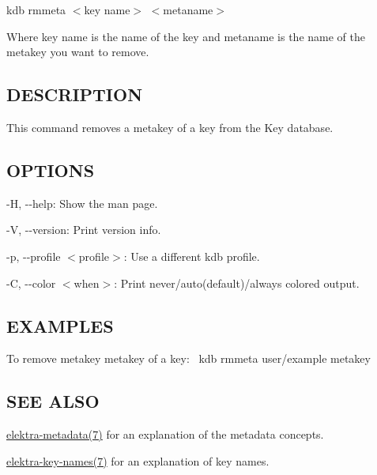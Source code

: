 {\ttfamily kdb rmmeta $<$key name$>$ $<$metaname$>$}

Where {\ttfamily key name} is the name of the key and {\ttfamily metaname} is the name of the metakey you want to remove.

\subsection*{D\+E\+S\+C\+R\+I\+P\+T\+I\+ON}

This command removes a metakey of a key from the Key database.

\subsection*{O\+P\+T\+I\+O\+NS}


\begin{DoxyItemize}
\item {\ttfamily -\/H}, {\ttfamily -\/-\/help}\+: Show the man page.
\item {\ttfamily -\/V}, {\ttfamily -\/-\/version}\+: Print version info.
\item {\ttfamily -\/p}, {\ttfamily -\/-\/profile $<$profile$>$}\+: Use a different kdb profile.
\item {\ttfamily -\/C}, {\ttfamily -\/-\/color $<$when$>$}\+: Print never/auto(default)/always colored output.
\end{DoxyItemize}

\subsection*{E\+X\+A\+M\+P\+L\+ES}

To remove metakey {\ttfamily metakey} of a key\+:~\newline
 {\ttfamily kdb rmmeta user/example metakey}

\subsection*{S\+EE A\+L\+SO}


\begin{DoxyItemize}
\item \hyperlink{md_doc_help_elektra-metadata_doc_help_elektra-metadata_md}{elektra-\/metadata(7)} for an explanation of the metadata concepts.
\item \hyperlink{md_doc_help_elektra-key-names_doc_help_elektra-key-names_md}{elektra-\/key-\/names(7)} for an explanation of key names. 
\end{DoxyItemize}